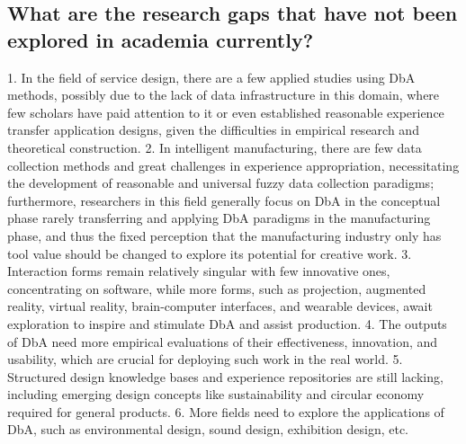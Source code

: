 
\subsection{What are the research gaps that have not been explored in academia currently? }
1. In the field of service design, there are a few applied studies using DbA methods, possibly due to the lack of data infrastructure in this domain, where few scholars have paid attention to it or even established reasonable experience transfer application designs, given the difficulties in empirical research and theoretical construction\cite{moreno2014analogies}. 
2. In intelligent manufacturing, there are few data collection methods and great challenges in experience appropriation, necessitating the development of reasonable and universal fuzzy data collection paradigms\cite{emerson2024anther, ross2022exploring}; furthermore, researchers in this field generally focus on DbA in the conceptual phase rarely transferring and applying DbA paradigms in the manufacturing phase, and thus the fixed perception that the manufacturing industry only has tool value should be changed to explore its potential for creative work\cite{hsueh2024counts}. 
3. Interaction forms remain relatively singular with few innovative ones, concentrating on software, while more forms, such as projection, augmented reality, virtual reality, brain-computer interfaces, and wearable devices, await exploration to inspire and stimulate DbA and assist production. 
4. The outputs of DbA need more empirical evaluations of their effectiveness, innovation, and usability, which are crucial for deploying such work in the real world\cite{verhaegen2013refinements}. 
5. Structured design knowledge bases and experience repositories are still lacking, including emerging design concepts like sustainability and circular economy required for general products\cite{liao2021priming}.
6. More fields need to explore the applications of DbA, such as environmental design\cite{ross2022exploring}, sound design, exhibition design, etc.



